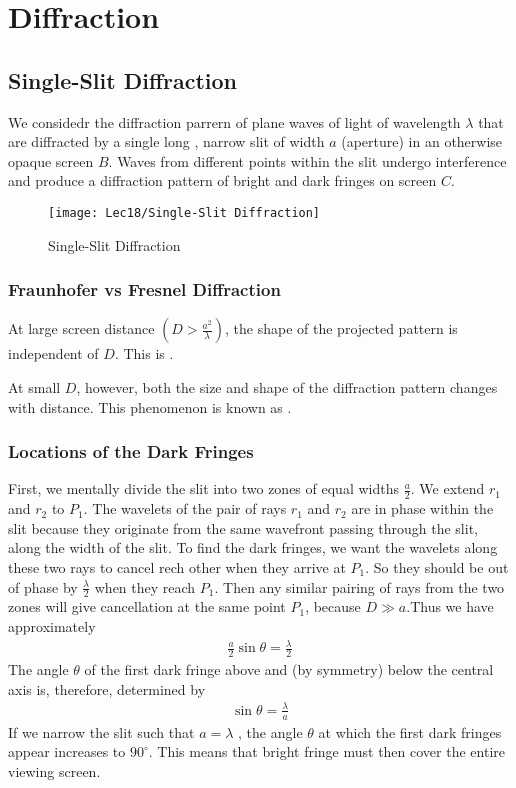 \newpage
\section{Diffraction}

\subsection{Single-Slit Diffraction}

We considedr the diffraction parrern of plane waves of light of wavelength $\lambda$ that are diffracted by a single long , narrow slit of width $a$ (aperture) in an otherwise opaque screen $B$. Waves from different points within the slit undergo interference and produce a diffraction pattern of bright and dark fringes on screen $C$. 

\begin{figure}[H]
    \centering
    \texttt{[image: Lec18/Single-Slit Diffraction]}
    \caption{Single-Slit Diffraction}
\end{figure}

\subsubsection{Fraunhofer vs Fresnel Diffraction}
At large screen distance $(D>\frac{a^2}{\lambda})$, the shape of the projected pattern is independent of $D$. This is . 

At small $D$, however, both the size and shape of the diffraction pattern changes with distance. This phenomenon is known as . 

\subsubsection{Locations of the Dark Fringes}
First, we mentally divide the slit into two zones of equal widths $\frac{a}{2}$. We extend $r_1$ and $r_2$ to $P_1$. The wavelets of the pair of rays $r_1$ and $r_2$ are in phase within the slit because they originate from the same wavefront passing through the slit, along the width of the slit. To find the dark fringes, we want the wavelets along these two rays to cancel rech other  when they arrive at $P_1$. So they should be out of phase by $\frac{\lambda }{2}$ when they reach $P_1$. Then any similar pairing of rays from the two zones will give cancellation at the same point $P_1$, because $D\gg a$.Thus we have approximately
\begin{align*}
    \frac{a}{2}\sin\theta=\frac{\lambda}{2}
\end{align*}
The angle $\theta$ of the first dark fringe above and (by symmetry) below the central axis is, therefore, determined by
\begin{align*}
    \sin\theta=\frac{\lambda}{a}
\end{align*}
If we narrow the slit such that $a=\lambda$ , the angle $\theta$ at which the first dark fringes appear increases to $90^{\circ} $. This means that bright fringe must then cover the entire viewing screen. 

